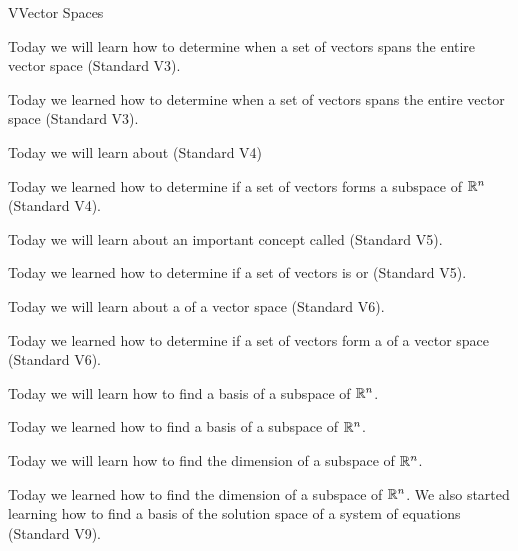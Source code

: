 \begin{module}{V}{Vector Spaces}
\newModuleSection
\begin{goals}
Today we will learn how to determine when a set of vectors spans the entire vector space (Standard V3).
\end{goals}
\begin{summary}
Today we learned how to determine when a set of vectors spans the entire vector space (Standard V3).
\end{summary}

\newModuleSection
\begin{goals}
Today we will learn about  (Standard V4)
\end{goals}
\begin{summary}
Today we learned how to determine if a set of vectors forms a  {subspace} of \(\mathbb{R}^n\) (Standard V4).
\end{summary}

\newModuleSection
\begin{goals}
Today we will learn about an important concept called  (Standard V5).
\end{goals}
\begin{summary}
Today we learned how to determine if a set of vectors is  or  (Standard V5).
\end{summary}

\newModuleSection
\begin{goals}
Today we will learn about a  of a vector space (Standard V6).
\end{goals}
\begin{summary}
Today we learned how to determine if a set of vectors form a  of a vector space (Standard V6).
\end{summary}

\newModuleSection
\begin{goals}
Today we will learn how to find a basis of a subspace of \(\mathbb{R}^n\).
\end{goals}
\begin{summary}
Today we learned how to find a basis of a subspace of \(\mathbb{R}^n\).
\end{summary}

\newModuleSection
\begin{goals}
Today we will learn how to find the dimension of a subspace of \(\mathbb{R}^n\).
\end{goals}
\begin{summary}
Today we learned how to find the dimension of a subspace of \(\mathbb{R}^n\). We also started learning how to find a basis of the solution space of a  system of equations (Standard V9).
\end{summary}


\end{module}
